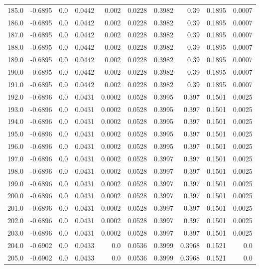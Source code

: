 \begin{longtable}{lrrrrrrrrr}
185.0 & -0.6895 & 0.0 & 0.0442 & 0.002 & 0.0228 & 0.3982 & 0.39 & 0.1895 & 0.0007 \\
186.0 & -0.6895 & 0.0 & 0.0442 & 0.002 & 0.0228 & 0.3982 & 0.39 & 0.1895 & 0.0007 \\
187.0 & -0.6895 & 0.0 & 0.0442 & 0.002 & 0.0228 & 0.3982 & 0.39 & 0.1895 & 0.0007 \\
188.0 & -0.6895 & 0.0 & 0.0442 & 0.002 & 0.0228 & 0.3982 & 0.39 & 0.1895 & 0.0007 \\
189.0 & -0.6895 & 0.0 & 0.0442 & 0.002 & 0.0228 & 0.3982 & 0.39 & 0.1895 & 0.0007 \\
190.0 & -0.6895 & 0.0 & 0.0442 & 0.002 & 0.0228 & 0.3982 & 0.39 & 0.1895 & 0.0007 \\
191.0 & -0.6895 & 0.0 & 0.0442 & 0.002 & 0.0228 & 0.3982 & 0.39 & 0.1895 & 0.0007 \\
192.0 & -0.6896 & 0.0 & 0.0431 & 0.0002 & 0.0528 & 0.3995 & 0.397 & 0.1501 & 0.0025 \\
193.0 & -0.6896 & 0.0 & 0.0431 & 0.0002 & 0.0528 & 0.3995 & 0.397 & 0.1501 & 0.0025 \\
194.0 & -0.6896 & 0.0 & 0.0431 & 0.0002 & 0.0528 & 0.3995 & 0.397 & 0.1501 & 0.0025 \\
195.0 & -0.6896 & 0.0 & 0.0431 & 0.0002 & 0.0528 & 0.3995 & 0.397 & 0.1501 & 0.0025 \\
196.0 & -0.6896 & 0.0 & 0.0431 & 0.0002 & 0.0528 & 0.3995 & 0.397 & 0.1501 & 0.0025 \\
197.0 & -0.6896 & 0.0 & 0.0431 & 0.0002 & 0.0528 & 0.3997 & 0.397 & 0.1501 & 0.0025 \\
198.0 & -0.6896 & 0.0 & 0.0431 & 0.0002 & 0.0528 & 0.3997 & 0.397 & 0.1501 & 0.0025 \\
199.0 & -0.6896 & 0.0 & 0.0431 & 0.0002 & 0.0528 & 0.3997 & 0.397 & 0.1501 & 0.0025 \\
200.0 & -0.6896 & 0.0 & 0.0431 & 0.0002 & 0.0528 & 0.3997 & 0.397 & 0.1501 & 0.0025 \\
201.0 & -0.6896 & 0.0 & 0.0431 & 0.0002 & 0.0528 & 0.3997 & 0.397 & 0.1501 & 0.0025 \\
202.0 & -0.6896 & 0.0 & 0.0431 & 0.0002 & 0.0528 & 0.3997 & 0.397 & 0.1501 & 0.0025 \\
203.0 & -0.6896 & 0.0 & 0.0431 & 0.0002 & 0.0528 & 0.3997 & 0.397 & 0.1501 & 0.0025 \\
204.0 & -0.6902 & 0.0 & 0.0433 & 0.0 & 0.0536 & 0.3999 & 0.3968 & 0.1521 & 0.0 \\
205.0 & -0.6902 & 0.0 & 0.0433 & 0.0 & 0.0536 & 0.3999 & 0.3968 & 0.1521 & 0.0 \\

\end{longtable}
